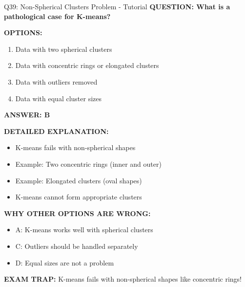 \documentclass[8pt]{beamer}
\begin{document}
	\begin{frame}{Q39: Non-Spherical Clusters Problem - Tutorial}
		\fontsize{6.5}{7.5}\selectfont
		\textbf{QUESTION: What is a pathological case for K-means?}
		
		\vspace{0.1cm}
		\textbf{OPTIONS:}
		\begin{enumerate}
			\item Data with two spherical clusters
			\item Data with concentric rings or elongated clusters
			\item Data with outliers removed
			\item Data with equal cluster sizes
		\end{enumerate}
		
		\vspace{0.1cm}
		\textcolor{myblue}{\textbf{ANSWER: B}}
		
		\vspace{0.1cm}
		\textbf{DETAILED EXPLANATION:}
		\begin{itemize}
			\item K-means fails with non-spherical shapes
			\item Example: Two concentric rings (inner and outer)
			\item Example: Elongated clusters (oval shapes)
			\item K-means cannot form appropriate clusters
		\end{itemize}
		
		\vspace{0.1cm}
		\textcolor{myred}{\textbf{WHY OTHER OPTIONS ARE WRONG:}}
		\begin{itemize}
			\item \textcolor{myred}{A:} K-means works well with spherical clusters
			\item \textcolor{myred}{C:} Outliers should be handled separately
			\item \textcolor{myred}{D:} Equal sizes are not a problem
		\end{itemize}
		
		\textcolor{myred}{\textbf{EXAM TRAP:}} K-means fails with \textcolor{myblue}{non-spherical shapes} like concentric rings!
	\end{frame}
	
\end{document}
